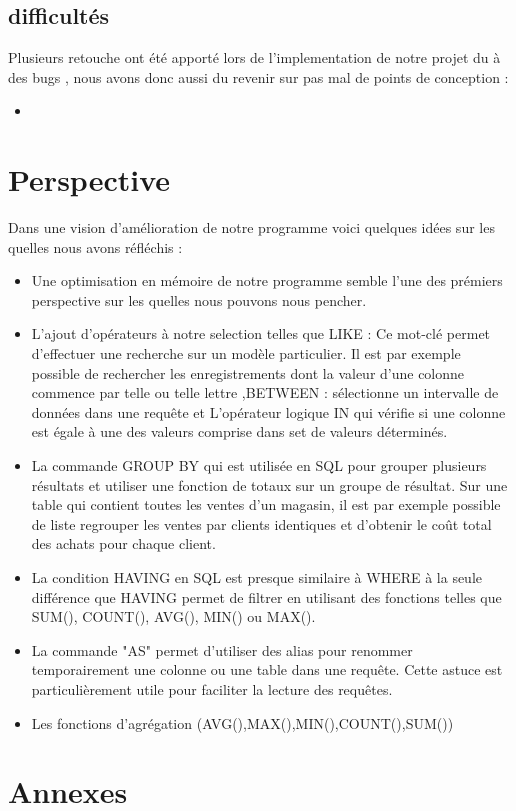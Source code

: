 \documentclass[oneside,13pt,a4paper]{report}
\begin{document}
\section{difficultés}

Plusieurs retouche ont été apporté lors de l'implementation de notre projet du à des bugs , nous avons donc aussi du revenir sur pas mal de points de conception :
\begin{itemize}
  \item 
\end{itemize}

\chapter{Perspective}

 Dans une vision d'amélioration de notre programme voici quelques idées sur les quelles nous avons réfléchis :

\begin{itemize}
\item Une optimisation en mémoire de notre programme semble l'une des prémiers perspective sur les quelles nous pouvons nous pencher.
\item L'ajout d'opérateurs à notre selection telles que LIKE : Ce mot-clé permet d’effectuer une recherche sur un modèle particulier. Il est par exemple possible de rechercher les enregistrements dont la valeur d’une colonne commence par telle ou telle lettre ,BETWEEN : sélectionne un intervalle de données dans une requête et L’opérateur logique IN qui vérifie si une colonne est égale à une des valeurs comprise dans set de valeurs déterminés.
\item La commande GROUP BY qui est utilisée en SQL pour grouper plusieurs résultats et utiliser une fonction de totaux sur un groupe de résultat. Sur une table qui contient toutes les ventes d’un magasin, il est par exemple possible de liste regrouper les ventes par clients identiques et d’obtenir le coût total des achats pour chaque client.
\item La condition HAVING en SQL est presque similaire à WHERE à la seule différence que HAVING permet de filtrer en utilisant des fonctions telles que SUM(), COUNT(), AVG(), MIN() ou MAX().
\item La commande "AS" permet d’utiliser des alias pour renommer temporairement une colonne ou une table dans une requête. Cette astuce est particulièrement utile pour faciliter la lecture des requêtes.
\item Les fonctions d'agrégation (AVG(),MAX(),MIN(),COUNT(),SUM())
\end{itemize}

\chapter{Annexes}
\end{document}
